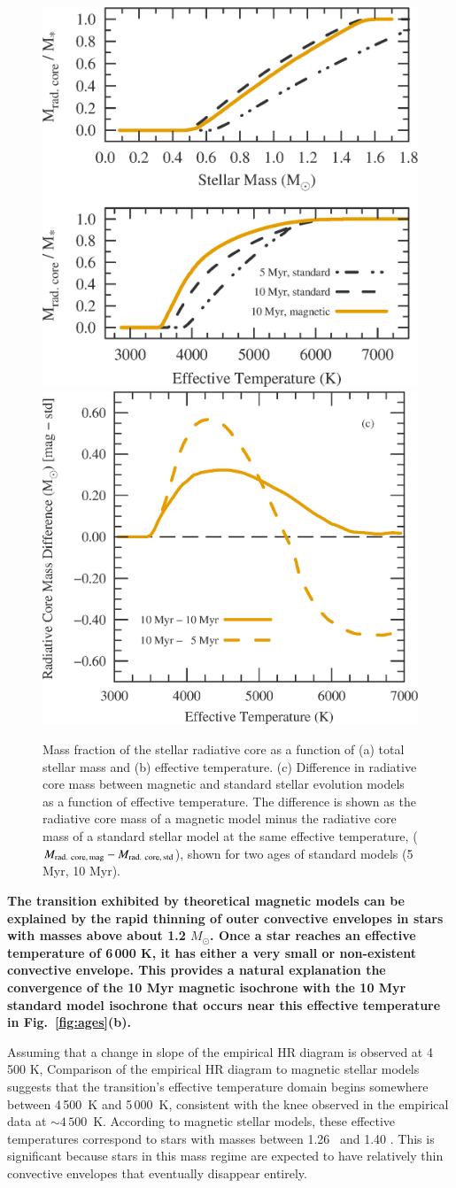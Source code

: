 \documentclass{aa}
\begin{document}
\begin{figure}[!ht]
    \centering
    \includegraphics[width=0.42\linewidth]{radiative_core_masses.eps} \qquad
    \includegraphics[width=0.48\linewidth]{radiative_core_mass_difference.eps}
    \caption{Mass fraction of the stellar radiative core as a function of (a) total stellar mass and (b) effective temperature. (c) Difference in radiative core mass between magnetic and standard stellar evolution models as a function of effective temperature. The difference is shown as the radiative core mass of a magnetic model minus the radiative core mass of a standard stellar model at the same effective temperature, ($M_{\rm rad.\ core,\, mag} - M_{\rm rad.\ core,\, std}$), shown for two ages of standard models (5 Myr, 10 Myr).}
    \label{fig:rad_core}
\end{figure}

{\bf The transition exhibited by theoretical magnetic models can be explained by the rapid thinning of outer convective envelopes in stars with masses above about 1.2 $M_{\odot}$.
Once a star reaches an effective temperature of 6\,000 K, it has either a very small or non-existent convective envelope. This provides a natural explanation the convergence of the 10 Myr magnetic isochrone with the 10 Myr standard model isochrone that occurs near this effective temperature in Fig.~\ref{fig:ages}(b).

Assuming that a change in slope of the empirical HR diagram is observed at 4\,500 K, 
Comparison of the empirical HR diagram to magnetic stellar models suggests that the transition's effective temperature domain begins somewhere between 4\,500~K and 5\,000~K, consistent with the knee observed in the empirical data at \teff$\sim 4\,500$~K. According to magnetic stellar models, these effective temperatures correspond to stars with masses between 1.26 \msun\ and 1.40 \msun. This is significant because stars in this mass regime are expected to have relatively thin convective envelopes that eventually disappear entirely. 
}
\end{document}
